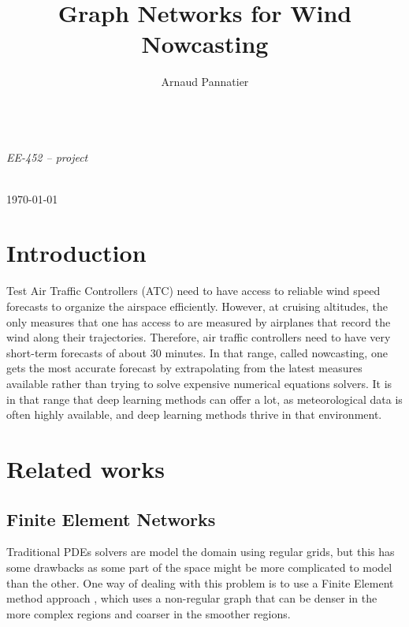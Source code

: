 \documentclass[a4paper,10pt]{article}
\title{Graph Networks for Wind Nowcasting}
\author{Arnaud Pannatier}
\newcommand{\ap}[1]{\marginpar{{\tiny \color{red} [AP] #1}}}
\begin{document}
\centering
\vspace*{0cm}
{\fontsize{35}{60}\selectfont \bfseries \thetitle } \\
\vspace{1cm}
\Large \textit{EE-452 -- project} \\
\vspace{0.5cm}
\normalfont
\Large \theauthor \\
\vspace{0.5cm}

\small\today

\normalfont\normalsize

\justifying

\section{Introduction}


Test
Air Traffic Controllers (ATC) need to have access to reliable wind speed forecasts to organize the airspace efficiently. However, at cruising altitudes, the only measures that one has access to are measured by airplanes that record the wind along their trajectories. Therefore, air traffic controllers need to have very short-term forecasts of about 30 minutes. In that range, called nowcasting, one gets the most accurate forecast by extrapolating from the latest measures available rather than trying to solve expensive numerical equations solvers. It is in that range that deep learning methods can offer a lot, as meteorological data is often highly available, and deep learning methods thrive in that environment.

\section{Related works}

\subsection{Finite Element Networks}

Traditional PDEs solvers are model the domain using regular grids, but this has some drawbacks as some part of the space might be more complicated to model than the other. One way of dealing with this problem is to use a Finite Element method approach \cite{hughes2012finite}, which uses a non-regular graph that can be denser in the more complex regions and coarser in the smoother regions.

\ap{advantages --drawbacks}
\end{document}
